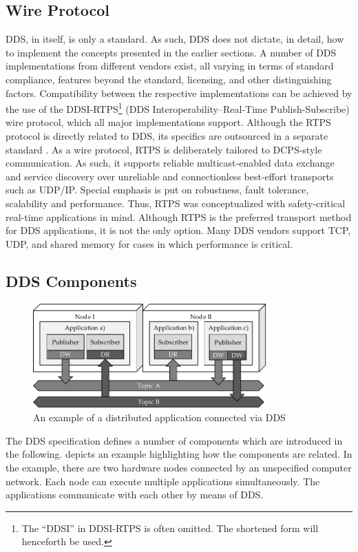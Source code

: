 \subsection{Wire Protocol}
DDS, in itself, is only a standard. As such, DDS does not dictate, in detail, how to implement the concepts presented in the earlier sections. A number of DDS implementations from different vendors exist, all varying in terms of standard compliance, features beyond the standard, licensing, and other distinguishing factors. Compatibility between the respective implementations can be achieved by the use of the DDSI-RTPS\footnote{The ``DDSI'' in DDSI-RTPS is often omitted. The shortened form will henceforth be used.} (DDS Interoperability--Real-Time Publish-Subscribe) wire protocol, which all major implementations support. Although the RTPS protocol is directly related to DDS, its specifics are outsourced in a separate standard \cite{rtps-2.2-standard}.
As a wire protocol, RTPS is deliberately tailored to DCPS-style communication. As such, it supports reliable multicast-enabled data exchange and service discovery over unreliable and connectionless best-effort transports such as UDP/IP. Special emphasis is put on robustness, fault tolerance, scalability and performance. Thus, RTPS was conceptualized with safety-critical real-time applications in mind. Although RTPS is the preferred transport method for DDS applications, it is not the only option. Many DDS vendors support TCP, UDP, and shared memory for cases in which performance is critical.

%
%
%
%
%
%
%
%
%
%
%
%
%
%
\subsection{DDS Components}
\begin{figure}[htpb]
  \centering
  \includegraphics[width=0.8\textwidth]{figures/dds.pdf}
  \caption[An example of a distributed application connected via DDS]{An example of a distributed application connected via DDS}\label{fig:dds}
\end{figure}
The DDS specification defines a number of components which are introduced in the following.  depicts an example highlighting how the components are related. In the example, there are two hardware nodes connected by an unspecified computer network. Each node can execute multiple applications simultaneously. The applications communicate with each other by means of DDS.


